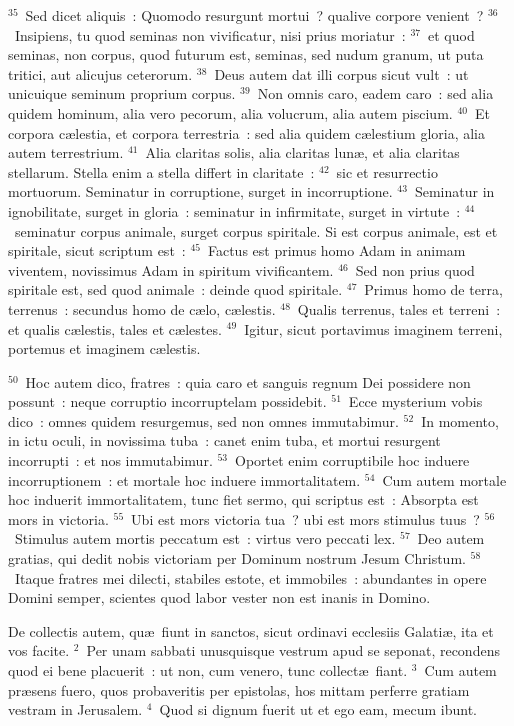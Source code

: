${}^{35}$~Sed dicet aliquis~: Quomodo resurgunt mortui~? qualive corpore venient~?
${}^{36}$~Insipiens, tu quod seminas non vivificatur, nisi prius moriatur~:
${}^{37}$~et quod seminas, non corpus, quod futurum est, seminas, sed nudum granum, ut puta tritici, aut alicujus ceterorum.
${}^{38}$~Deus autem dat illi corpus sicut vult~: ut unicuique seminum proprium corpus.
${}^{39}$~Non omnis caro, eadem caro~: sed alia quidem hominum, alia vero pecorum, alia volucrum, alia autem piscium.
${}^{40}$~Et corpora c\ae lestia, et corpora terrestria~: sed alia quidem c\ae lestium gloria, alia autem terrestrium.
${}^{41}$~Alia claritas solis, alia claritas lun\ae , et alia claritas stellarum. Stella enim a stella differt in claritate~:
${}^{42}$~sic et resurrectio mortuorum. Seminatur in corruptione, surget in incorruptione.
${}^{43}$~Seminatur in ignobilitate, surget in gloria~: seminatur in infirmitate, surget in virtute~:
${}^{44}$~seminatur corpus animale, surget corpus spiritale. Si est corpus animale, est et spiritale, sicut scriptum est~:
${}^{45}$~Factus est primus homo Adam in animam viventem, novissimus Adam in spiritum vivificantem.
${}^{46}$~Sed non prius quod spiritale est, sed quod animale~: deinde quod spiritale.
${}^{47}$~Primus homo de terra, terrenus~: secundus homo de c\ae lo, c\ae lestis.
${}^{48}$~Qualis terrenus, tales et terreni~: et qualis c\ae lestis, tales et c\ae lestes.
${}^{49}$~Igitur, sicut portavimus imaginem terreni, portemus et imaginem c\ae lestis.


${}^{50}$~Hoc autem dico, fratres~: quia caro et sanguis regnum Dei possidere non possunt~: neque corruptio incorruptelam possidebit.
${}^{51}$~Ecce mysterium vobis dico~: omnes quidem resurgemus, sed non omnes immutabimur.
${}^{52}$~In momento, in ictu oculi, in novissima tuba~: canet enim tuba, et mortui resurgent incorrupti~: et nos immutabimur.
${}^{53}$~Oportet enim corruptibile hoc induere incorruptionem~: et mortale hoc induere immortalitatem.
${}^{54}$~Cum autem mortale hoc induerit immortalitatem, tunc fiet sermo, qui scriptus est~: Absorpta est mors in victoria.
${}^{55}$~Ubi est mors victoria tua~? ubi est mors stimulus tuus~?
${}^{56}$~Stimulus autem mortis peccatum est~: virtus vero peccati lex.
${}^{57}$~Deo autem gratias, qui dedit nobis victoriam per Dominum nostrum Jesum Christum.
${}^{58}$~Itaque fratres mei dilecti, stabiles estote, et immobiles~: abundantes in opere Domini semper, scientes quod labor vester non est inanis in Domino.

\lettrine[lines=3,image=true,loversize=0.05,lraise=-0.03]{D}{}e collectis autem, qu\ae\ fiunt in sanctos, sicut ordinavi ecclesiis Galati\ae , ita et vos facite.
${}^{2}$~Per unam sabbati unusquisque vestrum apud se seponat, recondens quod ei bene placuerit~: ut non, cum venero, tunc collect\ae\ fiant.
${}^{3}$~Cum autem pr\ae sens fuero, quos probaveritis per epistolas, hos mittam perferre gratiam vestram in Jerusalem.
${}^{4}$~Quod si dignum fuerit ut et ego eam, mecum ibunt.


